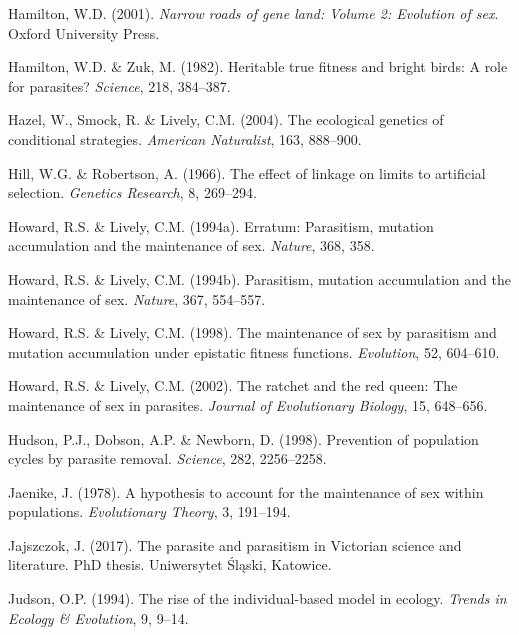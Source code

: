 \documentclass[
  letterpaper,
]{book}
\newlength{\cslhangindent}
\newenvironment{CSLReferences}[2] %
 {\begin{list}{}{%
  \setlength{\itemindent}{0pt}
  \setlength{\leftmargin}{0pt}
  \setlength{\parsep}{0pt}
  \ifodd #1
   \setlength{\leftmargin}{\cslhangindent}
   \setlength{\itemindent}{-1\cslhangindent}
  \fi
  \setlength{\itemsep}{#2\baselineskip}}}
 {\end{list}}
\begin{document}
\begin{CSLReferences}{1}{0}
Hamilton, W.D. (2001). \emph{Narrow roads of gene land: Volume 2:
Evolution of sex}. Oxford University Press.

Hamilton, W.D. \& Zuk, M. (1982). Heritable true fitness and bright
birds: A role for parasites? \emph{Science}, 218, 384--387.

Hazel, W., Smock, R. \& Lively, C.M. (2004). The ecological genetics of
conditional strategies. \emph{American Naturalist}, 163, 888--900.

Hill, W.G. \& Robertson, A. (1966). The effect of linkage on limits to
artificial selection. \emph{Genetics Research}, 8, 269--294.

Howard, R.S. \& Lively, C.M. (1994a). Erratum: Parasitism, mutation
accumulation and the maintenance of sex. \emph{Nature}, 368, 358.

Howard, R.S. \& Lively, C.M. (1994b). Parasitism, mutation accumulation
and the maintenance of sex. \emph{Nature}, 367, 554--557.

Howard, R.S. \& Lively, C.M. (1998). The maintenance of sex by
parasitism and mutation accumulation under epistatic fitness functions.
\emph{Evolution}, 52, 604--610.

Howard, R.S. \& Lively, C.M. (2002). The ratchet and the red queen: The
maintenance of sex in parasites. \emph{Journal of Evolutionary Biology},
15, 648--656.

Hudson, P.J., Dobson, A.P. \& Newborn, D. (1998). Prevention of
population cycles by parasite removal. \emph{Science}, 282, 2256--2258.

Jaenike, J. (1978). A hypothesis to account for the maintenance of sex
within populations. \emph{Evolutionary Theory}, 3, 191--194.

Jajszczok, J. (2017). The parasite and parasitism in {Victorian} science
and literature. PhD thesis. Uniwersytet Śląski, Katowice.

Judson, O.P. (1994). The rise of the individual-based model in ecology.
\emph{Trends in Ecology \& Evolution}, 9, 9--14.


\end{CSLReferences}
\end{document}
